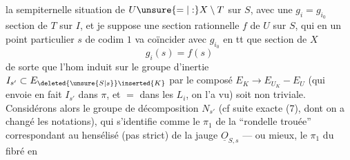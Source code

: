la sempiternelle situation de $U\unsure{=|:}X\setminus T$ sur $S$, avec une $g_i=g_{i_0}$ section de $T$ sur $I$, et je suppose  une section rationnelle $f$ de $U$ sur $S$, qui en un point particulier $s$ de  codim $1$ va coïncider avec $g_{i_0}$ en tt que section de $X$
\[
g_i(s)=f(s)
\]
de sorte que l'hom induit sur le groupe d'inertie $I_{s'}\subset E_{\deleted{\unsure{S|s}}\inserted{K}}$ par le composé $E_K\longrightarrow E_{U_K}-E_U$ (qui envoie en fait $I_{s'}$ dans $\pi$, et $=$ dans les $L_i$, on l'a vu) soit non  triviale. Considérons alors le groupe de décomposition $N_{s'}$ (cf suite exacte (7), dont on a changé les notations), qui s'identifie comme le $\pi_1$ de la ``rondelle trouée'' correspondant au hensélisé (pas strict) de la jauge $\underline O_{S,s}$ --- ou mieux, le $\pi_1$ du fibré en
